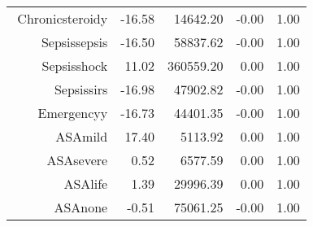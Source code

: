 \begin{tabular}{rrrrr}
$$  Chronic\-steroid\-y & -16.58 & 14642.20 & -0.00 & 1.00 \\ 
  Sepsis\-sepsis & -16.50 & 58837.62 & -0.00 & 1.00 \\ 
  Sepsis\-shock & 11.02 & 360559.20 & 0.00 & 1.00 \\ 
  Sepsis\-sirs & -16.98 & 47902.82 & -0.00 & 1.00 \\ 
  Emergency\-y & -16.73 & 44401.35 & -0.00 & 1.00 \\ 
  ASA\-mild & 17.40 & 5113.92 & 0.00 & 1.00 \\ 
  ASA\-severe & 0.52 & 6577.59 & 0.00 & 1.00 \\ 
  ASA\-life & 1.39 & 29996.39 & 0.00 & 1.00 \\ 
  ASA\-none & -0.51 & 75061.25 & -0.00 & 1.00 \\ 
   \hline
\end{tabular}

